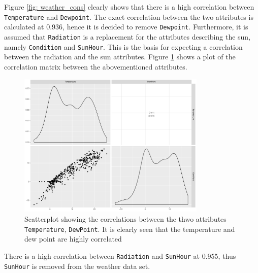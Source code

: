 \noindent Figure \ref{fig: weather_cons} clearly shows that there is a high correlation between \texttt{Temperature} and \texttt{Dewpoint}. The exact correlation between the two attributes is calculated at 0.936, hence it is decided to remove \texttt{Dewpoint}. Furthermore, it is assumed that \texttt{Radiation} is a replacement for the attributes describing the sun, namely \texttt{Condition} and \texttt{SunHour}. This is the basis for expecting a correlation between the radiation and the sun attributes. Figure \ref{fig: gg_cor} shows a plot of the correlation matrix between the abovementioned attributes.
\begin{figure}[H]
    \centering
    \includegraphics[width=0.8\textwidth]{../../../figures/gg_cor.pdf}
    \caption{Scatterplot showing the correlations between the thwo attributes \texttt{Temperature}, \texttt{DewPoint}. It is clearly seen that the temperature and dew point are highly correlated}
    \label{fig: gg_cor}
\end{figure}
\noindent There is a high correlation between \texttt{Radiation} and \texttt{SunHour} at 0.955, thus \texttt{SunHour} is removed from the weather data set. \\
 
